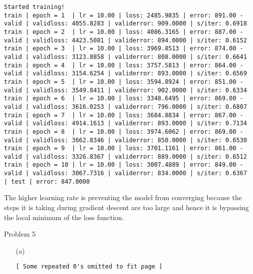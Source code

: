 \documentclass{article}
\begin{document}
\begin{itemize}
\begin{landscape}
\begin{itemize}
\begin{Verbatim}[fontsize=\small]
Started training!	
train | epoch = 1  | lr = 10.00 | loss: 2485.9835 | error: 891.00 - valid | validloss: 4055.8283 | validerror: 909.0000 | s/iter: 0.6918	
train | epoch = 2  | lr = 10.00 | loss: 4086.3165 | error: 887.00 - valid | validloss: 4423.5081 | validerror: 894.0000 | s/iter: 0.6152	
train | epoch = 3  | lr = 10.00 | loss: 3969.8513 | error: 874.00 - valid | validloss: 3123.8858 | validerror: 808.0000 | s/iter: 0.6641	
train | epoch = 4  | lr = 10.00 | loss: 3757.5813 | error: 864.00 - valid | validloss: 3154.6254 | validerror: 893.0000 | s/iter: 0.6569	
train | epoch = 5  | lr = 10.00 | loss: 3594.8924 | error: 851.00 - valid | validloss: 3549.8411 | validerror: 902.0000 | s/iter: 0.6334	
train | epoch = 6  | lr = 10.00 | loss: 3348.6495 | error: 869.00 - valid | validloss: 3616.0253 | validerror: 796.0000 | s/iter: 0.6807	
train | epoch = 7  | lr = 10.00 | loss: 3684.8834 | error: 867.00 - valid | validloss: 4914.1613 | validerror: 893.0000 | s/iter: 0.7134	
train | epoch = 8  | lr = 10.00 | loss: 3974.6062 | error: 869.00 - valid | validloss: 3662.8346 | validerror: 850.0000 | s/iter: 0.6530	
train | epoch = 9  | lr = 10.00 | loss: 3701.1161 | error: 861.00 - valid | validloss: 3326.8367 | validerror: 889.0000 | s/iter: 0.6512	
train | epoch = 10 | lr = 10.00 | loss: 3007.4889 | error: 849.00 - valid | validloss: 3067.7316 | validerror: 834.0000 | s/iter: 0.6367	
| test | error: 847.0000

    \end{Verbatim}
    
The higher learning rate is preventing the model from converging because the steps it is taking during gradient descent are too large
and hence it is bypassing the local minimum of the loss function.
	
	\end{itemize}
	
\end{landscape}
	
\newpage
{}	
\thispagestyle{empty}
\begin{landscape}
\item[Problem 5]

	\begin{itemize}
	
	\item[(a)]
	
		\begin{Verbatim}[fontsize=\small]
    [ Some repeated 0's omitted to fit page ]
	

\end{Verbatim}
\end{itemize}
\end{landscape}
\end{itemize}
\end{document}
